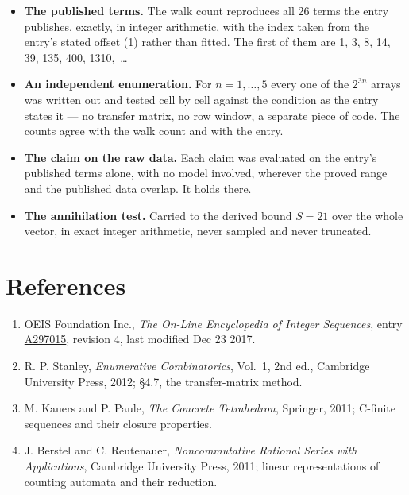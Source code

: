 \documentclass[11pt]{article}
\theoremstyle{definition}
\begin{document}
\begin{itemize}

\item {\bfseries The published terms.} The walk count reproduces all 26 terms the entry publishes, exactly, in integer arithmetic, with the index taken from the entry's stated offset (1) rather than fitted. The first of them are 1, 3, 8, 14, 39, 135, 400, 1310,~\dots

\item {\bfseries An independent enumeration.} For $n = 1,\dots,5$ every one of the $2^{3n}$ arrays was written out and tested cell by cell against the condition as the entry states it --- no transfer matrix, no row window, a separate piece of code. The counts agree with the walk count and with the entry.

\item {\bfseries The claim on the raw data.} Each claim was evaluated on the entry's published terms alone, with no model involved, wherever the proved range and the published data overlap. It holds there.

\item {\bfseries The annihilation test.} Carried to the derived bound $S = 21$ over the whole vector, in exact integer arithmetic, never sampled and never truncated.

\end{itemize}

\section{References}

\begin{enumerate}

\item OEIS Foundation Inc., \emph{The On-Line Encyclopedia of Integer Sequences}, entry \href{https://oeis.org/A297015}{A297015}, revision 4, last modified Dec 23 2017.

\item R. P. Stanley, \emph{Enumerative Combinatorics}, Vol.~1, 2nd ed., Cambridge University Press, 2012; \S4.7, the transfer-matrix method.

\item M. Kauers and P. Paule, \emph{The Concrete Tetrahedron}, Springer, 2011; C-finite sequences and their closure properties.

\item J. Berstel and C. Reutenauer, \emph{Noncommutative Rational Series with Applications}, Cambridge University Press, 2011; linear representations of counting automata and their reduction.

\end{enumerate}
\end{document}

